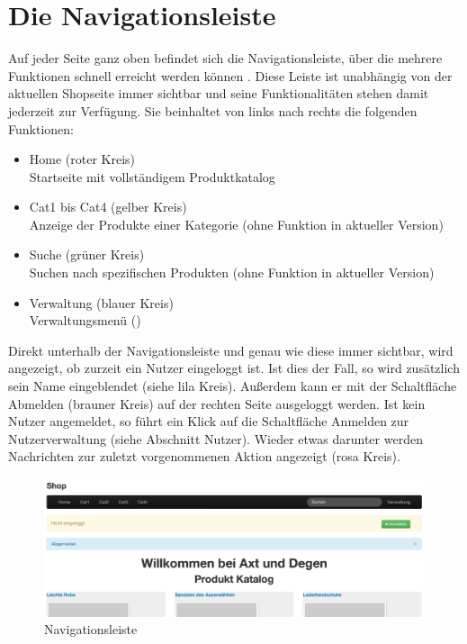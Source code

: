 \section{Die Navigationsleiste}
Auf jeder Seite ganz oben befindet sich die Navigationsleiste, über die mehrere Funktionen schnell erreicht werden können . Diese Leiste ist unabhängig von der aktuellen Shopseite immer sichtbar und seine Funktionalitäten stehen damit jederzeit zur Ver\-fü\-gung. Sie beinhaltet von links nach rechts die folgenden Funktionen:
\begin{itemize}
  \item Home (roter Kreis) \\
        Startseite mit vollständigem Produktkatalog
  \vspace*{-0.5em}
  \item Cat1 bis Cat4 (gelber Kreis) \\
        Anzeige der Produkte einer Kategorie (ohne Funktion in aktueller Version)
  \vspace*{-0.5em}
  \item Suche (grüner Kreis) \\
        Suchen nach spezifischen Produkten (ohne Funktion in aktueller Version)
  \vspace*{-0.5em}
  \item Verwaltung (blauer Kreis) \\
        Verwaltungsmenü ()
\end{itemize}
Direkt unterhalb der Navigationsleiste und genau wie diese immer sichtbar, wird angezeigt, ob zurzeit ein Nutzer eingeloggt ist. Ist dies der Fall, so wird zusätzlich sein Name eingeblendet  (siehe lila Kreis). Außerdem  kann er mit der Schaltfläche Abmelden (brauner Kreis) auf der rechten Seite ausgeloggt werden.  Ist kein Nutzer angemeldet, so führt ein Klick auf die Schaltfläche Anmelden zur Nutzerverwaltung (siehe Abschnitt Nutzer). 
Wieder etwas darunter werden Nachrichten zur zuletzt vorgenommenen Aktion angezeigt (rosa Kreis).

\begin{figure}[h!]
  \centering
  \includegraphics[width=\textwidth]{img/Navi.png}
  \caption{Navigationsleiste}
  \label{fig:Navigationsleiste}
\end{figure}


